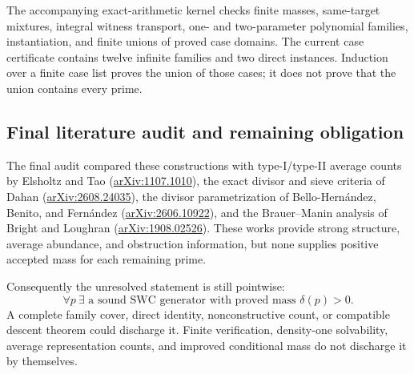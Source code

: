 The accompanying exact-arithmetic kernel checks finite masses, same-target
mixtures, integral witness transport, one- and two-parameter polynomial
families, instantiation, and finite unions of proved case domains.  The
current case certificate contains twelve infinite families and two direct
instances.  Induction over a finite case list proves the union of those cases;
it does not prove that the union contains every prime.

\subsection{Final literature audit and remaining obligation}

The final audit compared these constructions with type-I/type-II average
counts by Elsholtz and Tao
(\href{https://arxiv.org/abs/1107.1010}{arXiv:1107.1010}), the exact divisor
and sieve criteria of Dahan
(\href{https://arxiv.org/abs/2608.24035}{arXiv:2608.24035}), the divisor
parametrization of Bello-Hern\'andez, Benito, and Fern\'andez
(\href{https://arxiv.org/abs/2606.10922}{arXiv:2606.10922}), and the
Brauer--Manin analysis of Bright and Loughran
(\href{https://arxiv.org/abs/1908.02526}{arXiv:1908.02526}).  These works
provide strong structure, average abundance, and obstruction information, but
none supplies positive accepted mass for each remaining prime.

Consequently the unresolved statement is still pointwise:
\[
  \forall p\ \exists\text{ a sound SWC generator with proved mass }
  \delta(p)>0.
\]
A complete family cover, direct identity, nonconstructive count, or compatible
descent theorem could discharge it.  Finite verification, density-one
solvability, average representation counts, and improved conditional mass do
not discharge it by themselves.

